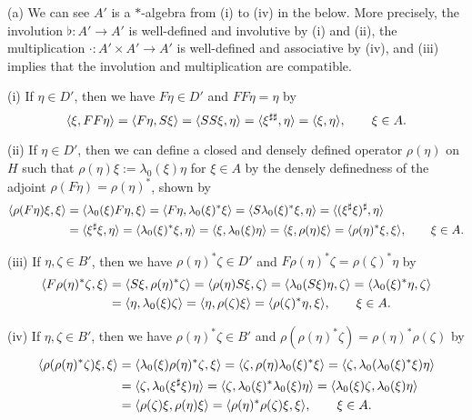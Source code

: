 \documentclass{../../large}
\begin{document}
\begin{pf}
(a)
We can see $A'$ is a $*$-algebra from (i) to (iv) in the below.
More precisely, the involution $\flat:A'\to A'$ is well-defined and involutive by (i) and (ii), the multiplication $\cdot:A'\times A'\to A'$ is well-defined and associative by (iv), and (iii) implies that the involution and multiplication are compatible.

(i)
If $\eta\in D'$, then we have $F\eta\in D'$ and $FF\eta=\eta$ by
\[\langle\xi,FF\eta\rangle=\langle F\eta,S\xi\rangle=\langle SS\xi,\eta\rangle=\langle\xi^{\sharp\sharp},\eta\rangle=\langle\xi,\eta\rangle,\qquad\xi\in A.\]

(ii)
If $\eta\in D'$, then we can define a closed and densely defined operator $\rho(\eta)$ on $H$ such that $\rho(\eta)\xi:=\lambda_0(\xi)\eta$ for $\xi\in A$ by the densely definedness of the adjoint $\rho(F\eta)=\rho(\eta)^*$, shown by
\begin{align*}
\langle\rho(F\eta)\xi,\xi\rangle
&=\langle\lambda_0(\xi)F\eta,\xi\rangle
=\langle F\eta,\lambda_0(\xi)^*\xi\rangle
=\langle S\lambda_0(\xi)^*\xi,\eta\rangle
=\langle(\xi^\sharp\xi)^\sharp,\eta\rangle\\
&=\langle\xi^\sharp\xi,\eta\rangle
=\langle\lambda_0(\xi)^*\xi,\eta\rangle
=\langle\xi,\lambda_0(\xi)\eta\rangle
=\langle\xi,\rho(\eta)\xi\rangle
=\langle\rho(\eta)^*\xi,\xi\rangle
,\qquad\xi\in A.
\end{align*}

(iii)
If $\eta,\zeta\in B'$, then we have $\rho(\eta)^*\zeta\in D'$ and $F\rho(\eta)^*\zeta=\rho(\zeta)^*\eta$ by
\begin{align*}
\langle F\rho(\eta)^*\zeta,\xi\rangle
&=\langle S\xi,\rho(\eta)^*\zeta\rangle
=\langle\rho(\eta)S\xi,\zeta\rangle
=\langle\lambda_0(S\xi)\eta,\zeta\rangle
=\langle\lambda_0(\xi)^*\eta,\zeta\rangle\\
&=\langle\eta,\lambda_0(\xi)\zeta\rangle
=\langle\eta,\rho(\zeta)\xi\rangle
=\langle\rho(\zeta)^*\eta,\xi\rangle
,\qquad\xi\in A.
\end{align*}

(iv)
If $\eta,\zeta\in B'$, then we have $\rho(\eta)^*\zeta\in B'$ and $\rho(\rho(\eta)^*\zeta)=\rho(\eta)^*\rho(\zeta)$ by
\begin{align*}
\langle\rho(\rho(\eta)^*\zeta)\xi,\xi\rangle
&=\langle\lambda_0(\xi)\rho(\eta)^*\zeta,\xi\rangle
=\langle\zeta,\rho(\eta)\lambda_0(\xi)^*\xi\rangle
=\langle\zeta,\lambda_0(\lambda_0(\xi)^*\xi)\eta\rangle\\
&=\langle\zeta,\lambda_0(\xi^\sharp\xi)\eta\rangle
=\langle\zeta,\lambda_0(\xi)^*\lambda_0(\xi)\eta\rangle
=\langle\lambda_0(\xi)\zeta,\lambda_0(\xi)\eta\rangle\\
&=\langle\rho(\zeta)\xi,\rho(\eta)\xi\rangle
=\langle\rho(\eta)^*\rho(\zeta)\xi,\xi\rangle
,\qquad\xi\in A.
\end{align*}



\end{pf}
\end{document}

